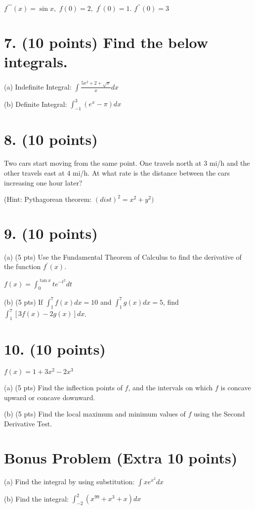 $f^{\prime\prime\prime}(x)=\sin x,$ $f(0)=2,$ $f^{\prime}(0)=1.$ $f^{\prime\prime}(0)=3$ 

\newpage

\section*{7. (10 points) Find the below integrals.}

(a) Indefinite Integral: $\int\frac{5x^{2}+2+\sqrt{x}}{x}dx$ 

(b) Definite Integral: $\int_{-1}^{3}(e^{x}-\pi)dx$ 

\newpage

\section{8. (10 points)}

 Two cars start moving from the same point. One travels north at $3$ mi/h and the other travels east at $4$ mi/h. At what rate is the distance between the cars increasing one hour later?

(Hint: Pythagorean theorem: $(dist)^{2}=x^{2}+y^{2})$  

\newpage

\section*{9. (10 points)}

(a) (5 pts) Use the Fundamental Theorem of Calculus to find the derivative of the function $f^{\prime}(x)$. 

$f(x) = \int_{0}^{\tan x} t e^{-t^{2}} dt$

(b) (5 pts) If $\int_{1}^{7} f(x) dx = 10$ and $\int_{1}^{7} g(x) dx = 5$, find $\int_{1}^{7} [3f(x) - 2g(x)] dx$.

\newpage

\section*{10. (10 points)} 

$f(x) = 1 + 3x^{2} - 2x^{3}$ 

(a) (5 pts) Find the inflection points of $f$, and the intervals on which $f$ is concave upward or concave downward.

(b) (5 pts) Find the local maximum and minimum values of $f$ using the Second Derivative Test. 

\newpage

\section*{Bonus Problem (Extra 10 points)}

(a) Find the integral by using substitution: $\int x e^{x^{2}} dx$ 

(b) Find the integral: $\int_{-2}^{2} (x^{99} + x^{3} + x) dx$ 

